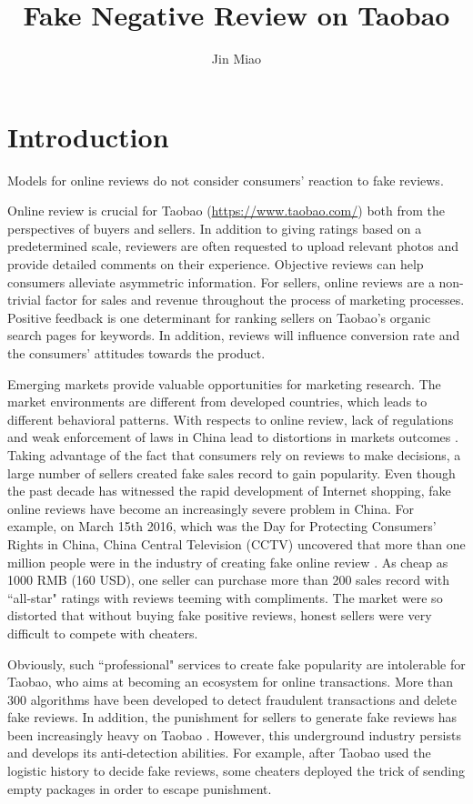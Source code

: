 ﻿\documentclass[a4paper,10pt]{article}
\title{Fake Negative Review on Taobao}
\author{Jin Miao}
\begin{document}
\maketitle
\doublespace
\section{Introduction}

Models for online reviews do not consider consumers’ reaction to fake reviews.

Online review is crucial for Taobao (\url{https://www.taobao.com/}) both from the perspectives of buyers and sellers. In addition to giving ratings based on a predetermined scale, reviewers are often requested to upload relevant photos and provide detailed comments on their experience. Objective reviews can help consumers alleviate asymmetric information. For sellers, online reviews are a non-trivial factor for sales and revenue throughout the process of marketing processes. Positive feedback is one determinant for ranking sellers on Taobao's organic search pages for keywords. In addition, reviews will influence conversion rate and the consumers' attitudes towards the product. 

Emerging markets provide valuable opportunities for marketing research. The market environments are different from developed countries, which leads to different behavioral patterns. With respects to online review, lack of regulations and weak enforcement of laws in China lead to distortions in markets outcomes \cite{Narasimhan2015}. Taking advantage of the fact that consumers rely on reviews to make decisions, a large number of sellers created fake sales record to gain popularity. Even though the past decade has witnessed the rapid development of Internet shopping, fake online reviews have become an increasingly severe problem in China. For example, on March 15th 2016, which was the Day for Protecting Consumers' Rights in China, China Central Television (CCTV) uncovered that more than one million people were in the industry of creating fake online review \cite{taobao}. As cheap as 1000 RMB (160 USD), one seller can purchase more than 200 sales record with ``all-star" ratings with reviews teeming with compliments. The market were so distorted that without buying fake positive reviews, honest sellers were very difficult to compete with cheaters. 

Obviously, such ``professional" services to create fake popularity are intolerable for Taobao, who aims at becoming an ecosystem for online transactions. More than 300 algorithms have been developed to detect fraudulent transactions and delete fake reviews. In addition, the punishment for sellers to generate fake reviews has been increasingly heavy on Taobao \cite{maijia}. However, this underground industry persists and develops its anti-detection abilities. For example, after Taobao used the logistic history to decide fake reviews, some cheaters deployed the trick of sending empty packages in order to escape punishment. 
\end{document}
